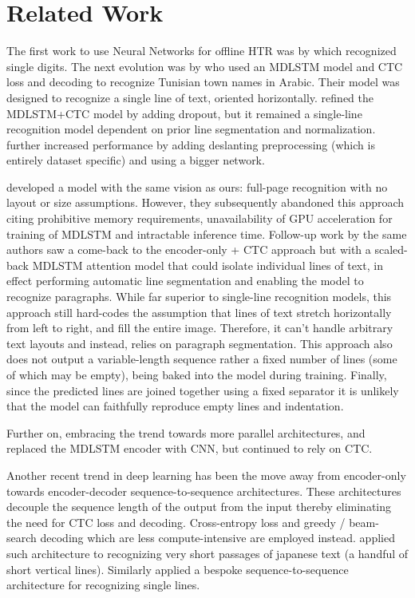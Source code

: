 \documentclass[runningheads]{llncs}
\begin{document}
\section{Related Work}
The first work to use Neural Networks for offline {\small HTR} was by \citet{726791} which recognized single digits. The next evolution was by \citet{Graves2008OfflineHR} who used an {\small MDLSTM} model and {\small CTC} loss and decoding \citep{Graves2006ConnectionistTC} to recognize Tunisian town names in Arabic. Their model was designed to recognize a single line of text, oriented horizontally. \cite{DBLP:journals/corr/PhamKL13} refined the MDLSTM+CTC model by adding dropout, but it remained a single-line recognition model dependent on prior line segmentation and normalization.
\citet{7814068} further increased performance by adding deslanting preprocessing (which is entirely dataset specific) and using a bigger network.

\citet{DBLP:journals/corr/BlucheLM16} developed a model with the same vision as ours: full-page recognition with no layout or size assumptions.
However, they subsequently abandoned this approach citing prohibitive memory requirements, unavailability of GPU acceleration for training of {\small MDLSTM} and intractable inference time.
Follow-up work by the same authors \citep{Bluche2016JointLS,8270042} saw a come-back to the encoder-only + {\small CTC} approach but with a scaled-back {\small MDLSTM} attention model that could isolate individual lines of text, in effect performing automatic line segmentation and enabling the model to recognize paragraphs.
While far superior to single-line recognition models, this approach still hard-codes the assumption that lines of text stretch horizontally from left to right, and fill the entire image.
Therefore, it can't handle arbitrary text layouts and instead, relies on paragraph segmentation.
This approach also does not output a variable-length sequence rather a fixed number of lines  (some of which may be empty),  being baked into the model during training.
Finally, since the predicted lines are joined together using a fixed separator it is unlikely that the model can faithfully reproduce empty lines and indentation.

Further on, embracing the trend towards more parallel architectures, \citet{8270042} and \citet{8269951} replaced the {\small MDLSTM} encoder with {\small CNN}, but continued to rely on {\small CTC}.


Another recent trend in deep learning has been the move away from encoder-only towards encoder-decoder sequence-to-sequence architectures. These architectures decouple the sequence length of the output from the input thereby eliminating the need for {\small CTC} loss and decoding. Cross-entropy loss and greedy / beam-search decoding which are less compute-intensive are employed instead. \citet{8978049} applied such architecture to recognizing very short passages of japanese text (a handful of short vertical lines). Similarly \citet{wang2019decoupled} applied a bespoke sequence-to-sequence architecture for recognizing single lines.
\end{document}

